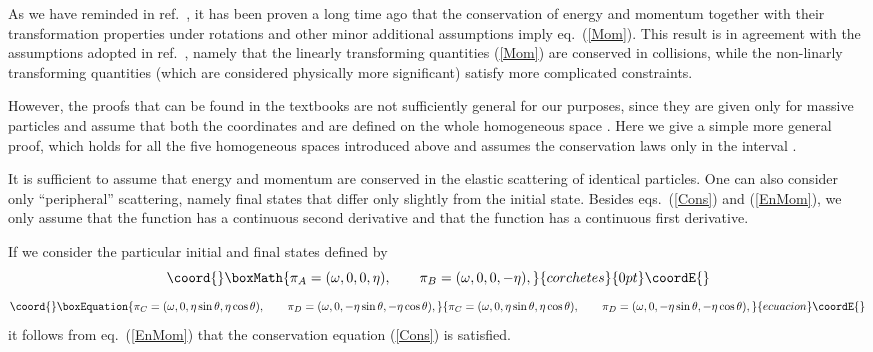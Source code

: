 \documentclass[a4paper,12pt]{article}
\begin{document}
As we have reminded in ref.\  \cite{Toller}, it has been proven a long time ago \cite{LT} that the conservation of energy and momentum together with their transformation properties under rotations and other minor additional assumptions imply eq.\  (\ref{Mom}). This result is in agreement with the assumptions adopted in ref.\ \cite{JV}, namely that the linearly transforming quantities (\ref{Mom}) are conserved in collisions, while the non-linarly transforming quantities (which are considered physically more significant) satisfy more complicated constraints.

However, the proofs that can be found in the textbooks \cite{Moller,Jackson} are not sufficiently general for our purposes, since they are given only for massive particles and assume that both the coordinates \coordHE{} and \coordHE{} are defined on the whole homogeneous space \myHighlight{$\Pi$}\coordHE{}. Here we give a simple more general proof, which holds for all the five homogeneous spaces introduced above and assumes the conservation laws only in the interval \coordHE{}. 

It is sufficient to assume that energy and momentum are conserved in the elastic scattering of identical particles. One can also consider only ``peripheral''  scattering, namely final states that differ only slightly from the initial state. Besides eqs.\ (\ref{Cons}) and (\ref{EnMom}), we only assume that the function \coordHE{} has a continuous second derivative and that the function \coordHE{} has a continuous first derivative.

If we consider the particular initial and final states defined by
\begin{displaymath}\coord{}\boxMath{
\pi_A = (\omega, 0, 0, \eta), \qquad
\pi_B = (\omega, 0, 0, -\eta),
}{corchetes}{0pt}\coordE{}\end{displaymath}
\begin{equation}\coord{}\boxEquation{
\pi_C = (\omega, 0, \eta \sin\theta, \eta \cos\theta), \qquad
\pi_D = (\omega, 0, -\eta \sin\theta, -\eta\cos\theta),
}{
\pi_C = (\omega, 0, \eta \sin\theta, \eta \cos\theta), \qquad
\pi_D = (\omega, 0, -\eta \sin\theta, -\eta\cos\theta),
}{ecuacion}\coordE{}\end{equation}
it follows from eq.\ (\ref{EnMom}) that the conservation equation (\ref{Cons}) is satisfied.
\end{document}
